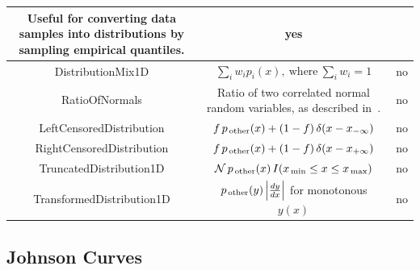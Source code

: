 \documentclass[12pt,titlepage]{article}
\newcommand{\sub}[1]{\ensuremath{_{\mbox{\scriptsize \,#1}}}}
\newcommand{\cname}[1]{\index{#1}\textsf{#1}}
\begin{document}
\begin{longtable}{|c|c|c|}
\begin{minipage}{0.52\linewidth}
                      Useful for converting data samples into distributions
                      by sampling empirical quantiles.
                      \end{minipage} & yes \\ \hline
\cname{DistributionMix1D} & $\sum_i w_i p_i(x), \ \mbox{where} \ \sum_i w_i = 1$ & no \\ \hline
\cname{RatioOfNormals} & \begin{minipage}{0.52\linewidth} 
                      \vskip1mm
                      Ratio of two correlated normal random variables, as described in~\cite{ref:ratioofnormals}.
                      \end{minipage} & no \\ \hline
\cname{LeftCensoredDistribution}  & $f \, p\sub{other}(x) + (1 - f) \, \delta(x - x_{-\infty})$ & no \\ \hline
\cname{RightCensoredDistribution}  & $f \, p\sub{other}(x) + (1 - f) \, \delta(x - x_{+\infty})$ & no \\ \hline
\cname{TruncatedDistribution1D} & ${\cal{N}} \, p\sub{other}(x) \, I(x\sub{min} \le x \le x\sub{max})$ & no \\ \hline
\cname{TransformedDistribution1D} & $p\sub{other}(y) \left| \frac{dy}{dx} \right|$ for monotonous $y(x)$ & no \\
\end{longtable}

\subsection{Johnson Curves}
\end{document}
